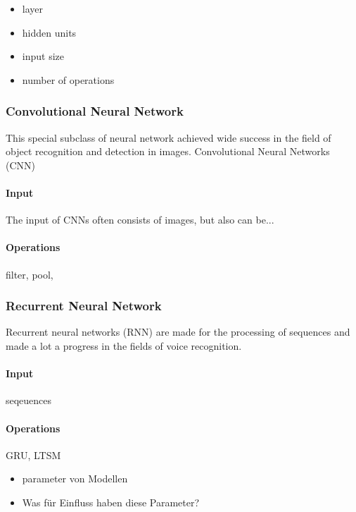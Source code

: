 \begin{itemize}
    \item layer
    \item hidden units
    \item input size
    \item number of operations
\end{itemize}
\subsubsection{Convolutional Neural Network}
This special subclass of neural network achieved wide success in the field of object recognition and detection in images. Convolutional Neural Networks (CNN)
\paragraph{Input}
The input of CNNs often consists of images, but also can be...

\paragraph{Operations}
filter, pool, 
\subsubsection{Recurrent Neural Network}
Recurrent neural networks (RNN) are made for the processing of sequences and made a lot a progress in the fields of voice recognition.
\paragraph{Input}
seqeuences
\paragraph{Operations}
GRU, LTSM
\begin{itemize}
    \item parameter von Modellen
    \item Was für Einfluss haben diese Parameter?
\end{itemize}



